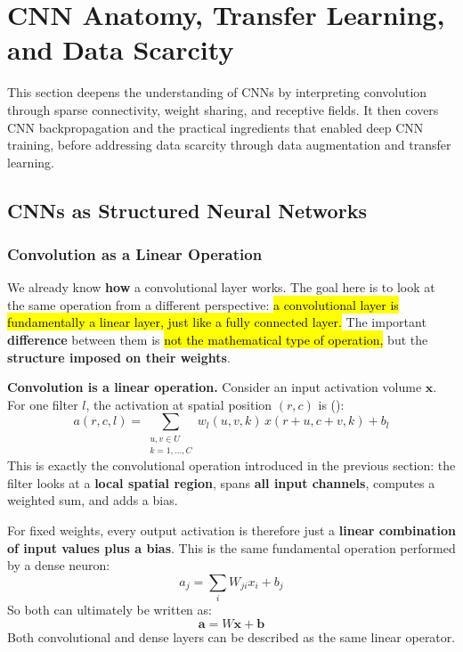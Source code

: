 \section{CNN Anatomy, Transfer Learning, and Data Scarcity}\label{sec:cnn-anatomy-transfer-learning-and-data-scarcity}

This section deepens the understanding of CNNs by interpreting convolution through sparse connectivity, weight sharing, and receptive fields. It then covers CNN backpropagation and the practical ingredients that enabled deep CNN training, before addressing data scarcity through data augmentation and transfer learning.

\longline

\subsection{CNNs as Structured Neural Networks}\label{subsec:cnns-as-structured-neural-networks}

\subsubsection{Convolution as a Linear Operation}\label{subsubsec:convolution-as-a-linear-operation}

We already know \textbf{how} a convolutional layer works. The goal here is to look at the same operation from a different perspective: \hl{a convolutional layer is fundamentally a linear layer, just like a fully connected layer.} The important \textbf{difference} between them is \hl{not the mathematical type of operation,} but the \textbf{structure imposed on their weights}.

\highspace
\textcolor{Green3}{ \textbf{Convolution is a linear operation.}} Consider an input activation volume $\mathbf{x}$. For one filter $l$, the activation at spatial position $(r,c)$ is ():
\begin{equation*}
    a(r,c,l)
    =
    \sum_{\substack{u,v \in U \\ k = 1, \ldots, C}}
    w_{l} (u,v,k)\,
    x(r+u,c+v,k)
    +
    b_{l}
\end{equation*}
This is exactly the convolutional operation introduced in the previous section: the filter looks at a \textbf{local spatial region}, spans \textbf{all input channels}, computes a weighted sum, and adds a bias.

\highspace
For fixed weights, every output activation is therefore just a \textbf{linear combination of input values plus a bias}. This is the same fundamental operation performed by a dense neuron:
\begin{equation*}
    a_j = \sum_i W_{ji} x_i + b_j
\end{equation*}
So both can ultimately be written as:
\begin{equation*}
    \mathbf{a} = W\mathbf{x} + \mathbf{b}
\end{equation*}
Both convolutional and dense layers can be described as the same linear operator.

